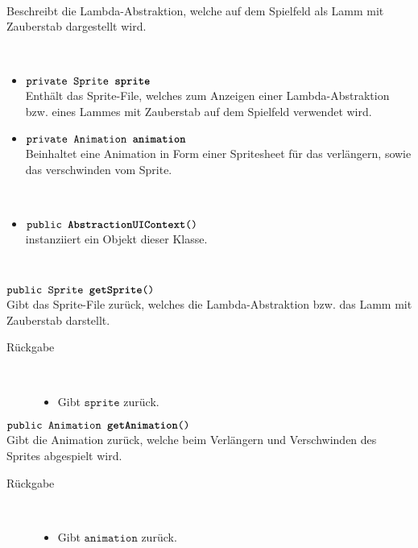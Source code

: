 \begin{description}
\item[Beschreibung] \hfill \\ Beschreibt die Lambda-Abstraktion, welche auf dem Spielfeld als Lamm mit Zauberstab dargestellt wird.
\item[Attribute] \hfill \\
	\vspace{-.8cm}
	\begin{itemize}	
		\item $\texttt{private Sprite \textbf{sprite}}$ \\ Enthält das Sprite-File, welches zum Anzeigen einer Lambda-Abstraktion bzw. eines Lammes mit Zauberstab auf dem Spielfeld verwendet wird.
		\item $\texttt{private Animation \textbf{animation}}$ \\ Beinhaltet eine Animation in Form einer Spritesheet für das verlängern, sowie das verschwinden vom Sprite.
		\end{itemize}
	
\item[Konstruktoren] \hfill \\
	\vspace{-.8cm}
	\begin{itemize}
		\item $\texttt{public \textbf{AbstractionUIContext}()}$ \\ instanziiert ein Objekt dieser Klasse.

	\end{itemize}
	
\item[Methoden] \hfill \\
	\vspace{-.8cm}
		\item $\texttt{public Sprite \textbf{getSprite}()}$ \\ Gibt das Sprite-File zurück, welches die Lambda-Abstraktion bzw. das Lamm mit Zauberstab darstellt.
		\begin{description}
			\item[Rückgabe] \hfill \\
			\vspace{-.8cm}
			\begin{itemize}
				\item Gibt $\texttt{sprite}$ zurück.
			\end{itemize}
			\end{description}
			
		\item $\texttt{public Animation \textbf{getAnimation}()}$ \\ Gibt die Animation zurück, welche beim Verlängern und Verschwinden des Sprites abgespielt wird.
		\begin{description}
			\item[Rückgabe] \hfill \\
			\vspace{-.8cm}
			\begin{itemize}
				\item Gibt $\texttt{animation}$ zurück.
			\end{itemize}
			\end{description}
			

\end{description}
